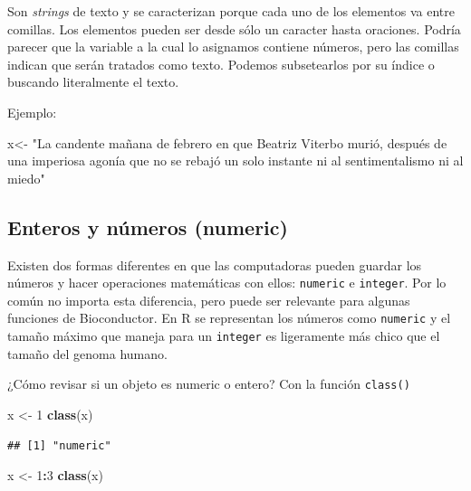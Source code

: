 \documentclass[
]{book}
\newenvironment{Shaded}{\begin{snugshade}}{\end{snugshade}}
\newcommand{\DecValTok}[1]{\textcolor[rgb]{0.00,0.00,0.81}{#1}}
\newcommand{\FunctionTok}[1]{\textcolor[rgb]{0.13,0.29,0.53}{\textbf{#1}}}
\newcommand{\NormalTok}[1]{#1}
\newcommand{\OtherTok}[1]{\textcolor[rgb]{0.56,0.35,0.01}{#1}}
\newcommand{\SpecialCharTok}[1]{\textcolor[rgb]{0.81,0.36,0.00}{\textbf{#1}}}
\newcommand{\StringTok}[1]{\textcolor[rgb]{0.31,0.60,0.02}{#1}}
\begin{document}
Son \emph{strings} de texto y se caracterizan porque cada uno de los elementos va entre comillas. Los elementos pueden ser desde sólo un caracter hasta oraciones.
Podría parecer que la variable a la cual lo asignamos contiene números, pero las comillas indican que serán tratados como texto. Podemos subsetearlos por su índice o buscando literalmente el texto.

Ejemplo:

\begin{Shaded}
\begin{Highlighting}[]
\NormalTok{x}\OtherTok{\textless{}{-}} \StringTok{"La candente mañana de febrero en que Beatriz Viterbo murió, después de una imperiosa agonía que no se rebajó un solo instante ni al sentimentalismo ni al miedo"}
\end{Highlighting}
\end{Shaded}

\subsection{Enteros y números (numeric)}\label{enteros-y-nuxfameros-numeric}

Existen dos formas diferentes en que las computadoras pueden guardar los números y hacer operaciones matemáticas con ellos: \texttt{numeric} e \texttt{integer}.
Por lo común no importa esta diferencia, pero puede ser relevante para algunas funciones de Bioconductor. En R se representan los números como \texttt{numeric} y el tamaño máximo que maneja para un \texttt{integer} es ligeramente más chico que el tamaño del genoma humano.

¿Cómo revisar si un objeto es numeric o entero? Con la función \texttt{class()}

\begin{Shaded}
\begin{Highlighting}[]
\NormalTok{x }\OtherTok{\textless{}{-}} \DecValTok{1}
\FunctionTok{class}\NormalTok{(x)}
\end{Highlighting}
\end{Shaded}

\begin{verbatim}
## [1] "numeric"
\end{verbatim}

\begin{Shaded}
\begin{Highlighting}[]
\NormalTok{x }\OtherTok{\textless{}{-}} \DecValTok{1}\SpecialCharTok{:}\DecValTok{3}
\FunctionTok{class}\NormalTok{(x)}
\end{Highlighting}
\end{Shaded}
\end{document}
